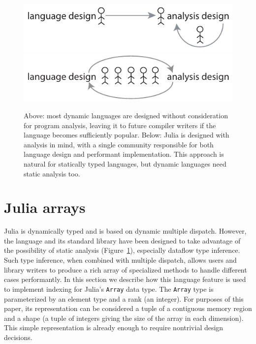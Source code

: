 \documentclass[preprint]{sigplanconf}
\newcommand{\code}[1]{\texttt{#1}}
\begin{document}


\begin{figure}
  \centering
  \includegraphics[width=\columnwidth]{fig-design-old}
  \includegraphics[width=\columnwidth]{fig-design-new}
  \caption{\label{fig:langdesign}
Above: most dynamic languages are designed without consideration for program
analysis, leaving it to future compiler writers if the language becomes
sufficiently popular.
Below: Julia is designed with analysis in mind, with a single community responsible
for both language design and performant implementation. This approach is
natural for statically typed languages, but dynamic languages need static analysis too.}
\end{figure}

\section{Julia arrays}

Julia\cite{Bezanson:2012jf} is dynamically typed and is based on dynamic
multiple dispatch. However, the language and its standard library have been
designed to take advantage of the possibility of static analysis
(Figure~\ref{fig:langdesign}), especially dataflow type inference. Such type
inference, when combined with multiple dispatch, allows users and library
writers to produce a rich array of specialized methods to handle different
cases performantly. In this section we describe how this language feature
is used to implement indexing for Julia's \code{Array} data type.
The \code{Array} type is parameterized by an element type and a rank (an
integer). For purposes of this paper, its representation can be considered a
tuple of a contiguous memory region and a shape (a tuple of integers giving
the size of the array in each dimension). This simple representation is
already enough to require nontrivial design decisions.
\end{document}
